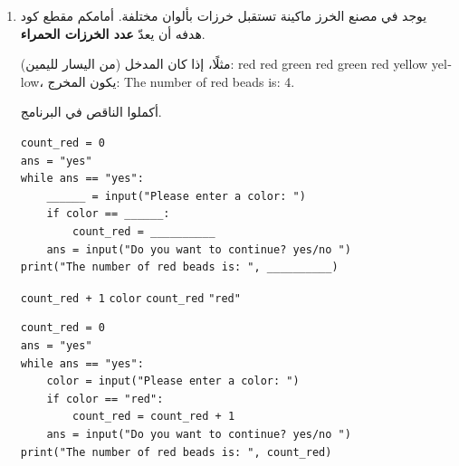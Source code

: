 \documentclass[14pt]{extarticle}
\begin{document}
\begin{enumerate}[itemsep=3em]
\begin{boxSolution}
\begin{english}
\begin{verbatim}
    finalGrade = (grade1 + grade2 + grade3) / 3
    if grade3 > 85:
        finalGrade = finalGrade + 5
    if finalGrade > 100:
        finalGrade = 100

    print(name, finalGrade)
    if finalGrade == 100:
        count100 = count100 + 1

print("Number of students with grade 100:", count100)
\end{verbatim}
\end{english}
\end{boxSolution}
\fi

\clearpage

\item يوجد في مصنع الخرز ماكينة تستقبل خرزات بألوان مختلفة. أمامكم مقطع كود هدفه أن يعدّ \textbf{عدد الخرزات الحمراء}.

مثلًا، إذا كان المدخل (من اليسار لليمين): \textenglish{red red green red green red yellow yellow}، يكون المخرج: \textenglish{The number of red beads is: 4}.

أكملوا الناقص في البرنامج.

\begin{boxCode}
\begin{english}
\begin{verbatim}
count_red = 0
ans = "yes"
while ans == "yes":
    ______ = input("Please enter a color: ")
    if color == ______:
        count_red = __________
    ans = input("Do you want to continue? yes/no ")
print("The number of red beads is: ", __________)
\end{verbatim}
\end{english}
\end{boxCode}

\begin{center}
\begin{english}
\texttt{count\_red + 1} \quad \texttt{color} \quad \texttt{count\_red} \quad \texttt{"red"}
\end{english}
\end{center}

\ifwithsols
\begin{boxSolution}
\begin{english}
\begin{verbatim}
count_red = 0
ans = "yes"
while ans == "yes":
    color = input("Please enter a color: ")
    if color == "red":
        count_red = count_red + 1
    ans = input("Do you want to continue? yes/no ")
print("The number of red beads is: ", count_red)
\end{verbatim}
\end{english}
\end{boxSolution}
\fi


\end{enumerate}
\end{document}
